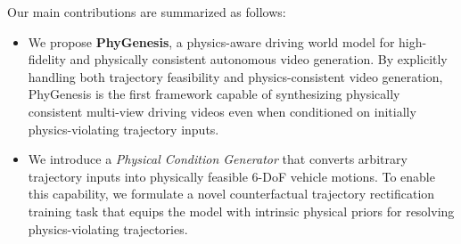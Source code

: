 \documentclass[runningheads]{llncs}
\begin{document}
Our main contributions are summarized as follows:
\begin{itemize}



    


 \item We propose \textbf{PhyGenesis}, a physics-aware driving world model for high-fidelity and physically consistent autonomous video generation. By explicitly handling both {trajectory feasibility} and {physics-consistent video generation}, PhyGenesis is the first framework capable of synthesizing physically consistent multi-view driving videos even when conditioned on initially physics-violating trajectory inputs.


\item We introduce a \textit{Physical Condition Generator} that converts arbitrary trajectory inputs into physically feasible 6-DoF vehicle motions. To enable this capability, we formulate a novel {counterfactual trajectory rectification training task} that equips the model with intrinsic physical priors for resolving physics-violating trajectories.




\end{itemize}
\end{document}
